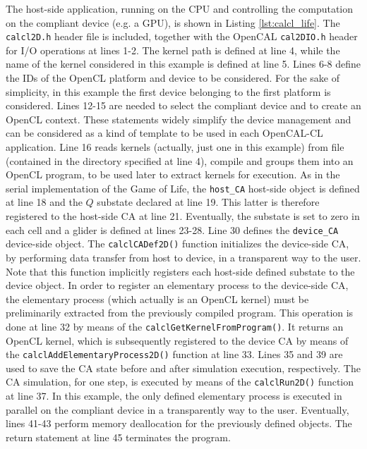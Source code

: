 The host-side application, running on the CPU and controlling
the computation on the compliant device (e.g. a GPU), is shown
in Listing \ref{lst:calcl_life}.  The \verb'calcl2D.h' header
file is included, together with the OpenCAL \verb'cal2DIO.h'
header for I/O operations at lines 1-2. The kernel path is
defined at line 4, while the name of the kernel considered in
this example is defined at line 5. Lines 6-8 define the IDs of
the OpenCL platform and device to be considered. For the sake of
simplicity, in this example the first device belonging to the
first platform is considered. Lines 12-15 are needed to select
the compliant device and to create an OpenCL context. These
statements widely simplify the device management and can be
considered as a kind of template to be used in each OpenCAL-CL
application. Line 16 reads kernels (actually, just one in this
example) from file (contained in the directory specified at line
4), compile and groups them into an OpenCL program, to be used
later to extract kernels for execution. As in the serial
implementation of the Game of Life, the \verb'host_CA' host-side
object is defined at line 18 and the $Q$ substate declared at
line 19. This latter is therefore registered to the host-side CA
at line 21. Eventually, the substate is set to zero in each cell
and a glider is defined at lines 23-28. Line 30 defines the
\verb'device_CA' device-side object. The \verb'calclCADef2D()'
function initializes the device-side CA, by performing data
transfer from host to device, in a transparent way to the
user. Note that this function implicitly registers each
host-side defined substate to the device object. In order to
register an elementary process to the device-side CA, the
elementary process (which actually is an OpenCL kernel) must be
preliminarily extracted from the previously compiled
program. This operation is done at line 32 by means of the
\verb'calclGetKernelFromProgram()'. It returns an OpenCL kernel,
which is subsequently registered to the device CA by means of
the \verb'calclAddElementaryProcess2D()' function at line
33. Lines 35 and 39 are used to save the CA state before and
after simulation execution, respectively. The CA simulation, for
one step, is executed by means of the \verb'calclRun2D()'
function at line 37. In this example, the only defined
elementary process is executed in parallel on the compliant
device in a transparently way to the user. Eventually, lines
41-43 perform memory deallocation for the previously defined
objects. The return statement at line 45 terminates the program.


